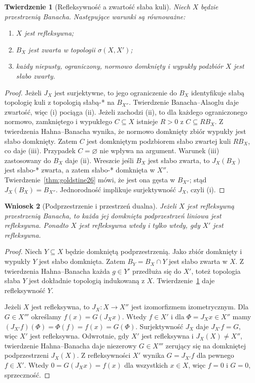 \documentclass[11pt,a4paper]{article}
\numberwithin{equation}{section}
\theoremstyle{plain}
\newtheorem{twierdzenie}{Twierdzenie}[section]
\newtheorem{wniosek}[twierdzenie]{Wniosek}
\theoremstyle{definition}
\theoremstyle{remark}
\begin{document}
\begin{twierdzenie}[Refleksywność a zwartość słaba kuli]
\label{thm:reflexive-ball26}
Niech $X$ będzie przestrzenią Banacha. Następujące warunki
są równoważne:
\begin{enumerate}[label=\textup{(\roman*)}]
\item $X$ jest refleksywna;
\item $B_X$ jest zwarta w topologii $\sigma(X,X')$;
\item każdy niepusty, ograniczony, normowo domknięty i wypukły
podzbiór $X$ jest słabo zwarty.
\end{enumerate}
\end{twierdzenie}
\begin{proof}
Jeżeli $J_X$ jest surjektywne, to jego ograniczenie do $B_X$
identyfikuje słabą topologię kuli z topologią słabą-* na $B_{X''}$.
Twierdzenie Banacha--Alaoglu daje zwartość, więc (i) pociąga (ii).
Jeżeli zachodzi (ii), to dla każdego ograniczonego normowo,
zamkniętego i wypukłego $C\subseteq X$ istnieje $R>0$ z
$C\subseteq RB_X$. Z twierdzenia Hahna--Banacha wynika, że
normowo domknięty zbiór wypukły jest słabo domknięty.
Zatem $C$ jest domkniętym podzbiorem słabo zwartej kuli $RB_X$,
co daje (iii). Przypadek $C=\varnothing$ nie wpływa na argument.
Warunek (iii) zastosowany do $B_X$ daje (ii).
Wreszcie jeśli $B_X$ jest słabo zwarta, to $J_X(B_X)$ jest
słabo-* zwarta, a zatem słabo-* domknięta w $X''$.
Twierdzenie~\ref{thm:goldstine26} mówi, że jest ona gęsta
w $B_{X''}$; stąd $J_X(B_X)=B_{X''}$.
Jednorodność implikuje surjektywność $J_X$, czyli (i).
\end{proof}

\begin{wniosek}[Podprzestrzenie i przestrzeń dualna]
\label{cor:reflexivity-stability26}
Jeżeli $X$ jest refleksywną przestrzenią Banacha, to każda
jej domknięta podprzestrzeń liniowa jest refleksywna.
Ponadto $X$ jest refleksywna wtedy i tylko wtedy, gdy $X'$
jest refleksywna.
\end{wniosek}
\begin{proof}
Niech $Y\subseteq X$ będzie domkniętą podprzestrzenią.
Jako zbiór domknięty i wypukły $Y$ jest słabo domknięta.
Zatem $B_Y=B_X\cap Y$ jest słabo zwarta w $X$.
Z twierdzenia Hahna--Banacha każda $g\in Y'$ przedłuża się
do $X'$, toteż topologia słaba $Y$ jest dokładnie topologią
indukowaną z $X$. Twierdzenie~\ref{thm:reflexive-ball26}
daje refleksywność $Y$.

Jeżeli $X$ jest refleksywna, to $J_X:X\to X''$ jest
izomorfizmem izometrycznym. Dla $G\in X'''$ określamy
$f(x)=G(J_Xx)$. Wtedy $f\in X'$ i dla $\Phi=J_Xx\in X''$
mamy $(J_{X'}f)(\Phi)=\Phi(f)=f(x)=G(\Phi)$.
Surjektywność $J_X$ daje $J_{X'}f=G$, więc $X'$ jest refleksywna.
Odwrotnie, gdy $X'$ jest refleksywna i $J_X(X)\ne X''$,
twierdzenie Hahna--Banacha daje niezerowy $G\in X'''$
zerujący się na domkniętej podprzestrzeni $J_X(X)$.
Z refleksywności $X'$ wynika $G=J_{X'}f$ dla pewnego $f\in X'$.
Wtedy $0=G(J_Xx)=f(x)$ dla wszystkich $x\in X$, więc
$f=0$ i $G=0$, sprzeczność.
\end{proof}
\end{document}
